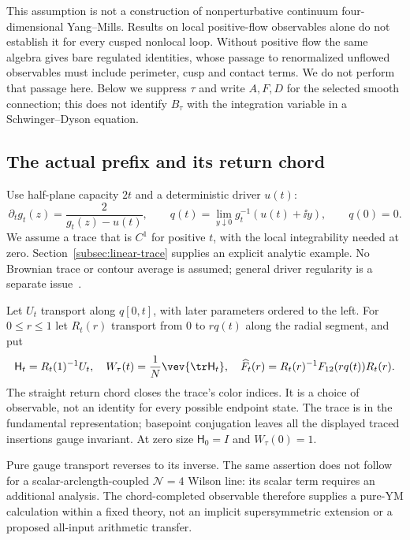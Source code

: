 This assumption is not a construction of nonperturbative
continuum four-dimensional Yang--Mills. Results on local
positive-flow observables alone do not establish it for every
cusped nonlocal loop. Without positive flow the same algebra
gives bare regulated identities, whose passage to renormalized
unflowed observables must include perimeter, cusp and contact
terms. We do not perform that passage here. Below we suppress
$\tau$ and write $A,F,D$ for the selected smooth connection;
this does not identify $B_\tau$ with the integration variable in
a Schwinger--Dyson equation.

\subsection{The actual prefix and its return chord}

Use half-plane capacity $2t$ and a deterministic driver $u(t)$:
\begin{equation}\label{eq:trace-definition}
 \partial_tg_t(z)=\frac2{g_t(z)-u(t)},\qquad
 q(t)=\lim_{y\downarrow0}g_t^{-1}(u(t)+\ii y),\qquad q(0)=0.
\end{equation}
We assume a trace that is $C^1$ for positive $t$, with the local
integrability needed at zero. Section~\ref{subsec:linear-trace}
supplies an explicit analytic example. No Brownian trace or
contour average is assumed; general driver regularity is a
separate issue~\cite{LindTran}.

Let $U_t$ transport along $q[0,t]$, with later parameters ordered
to the left. For $0\le r\le1$ let $R_t(r)$ transport from $0$ to
$rq(t)$ along the radial segment, and put
\begin{equation}\label{eq:trace-holonomy}
 \mathsf H_t=R_t(1)^{-1}U_t,\quad
 W_\tau(t)=\frac1N\vev{\tr\mathsf H_t},\quad
 \widehat F_t(r)=R_t(r)^{-1}F_{12}(rq(t))R_t(r).
\end{equation}
The straight return chord closes the trace's color indices.
It is a choice of observable, not an identity for every possible
endpoint state. The trace is in the fundamental representation;
basepoint conjugation leaves all the displayed traced insertions
gauge invariant. At zero size $\mathsf H_0=I$ and $W_\tau(0)=1$.

Pure gauge transport reverses to its inverse. The same assertion
does not follow for a scalar-arclength-coupled $\mathcal N=4$
Wilson line: its scalar term requires an additional analysis.
The chord-completed observable therefore supplies a pure-YM
calculation within a fixed theory, not an implicit supersymmetric
extension or a proposed all-input arithmetic transfer.

